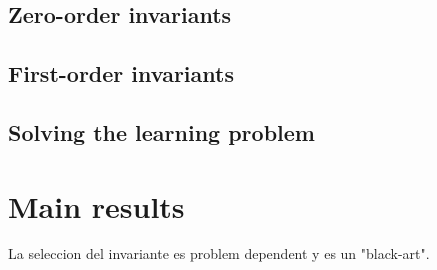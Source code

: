 \subsection{Zero-order invariants}

\subsection{First-order invariants}




\subsection{Solving the learning problem}

\section{Main results}

La seleccion del invariante es problem dependent y es un "black-art".
